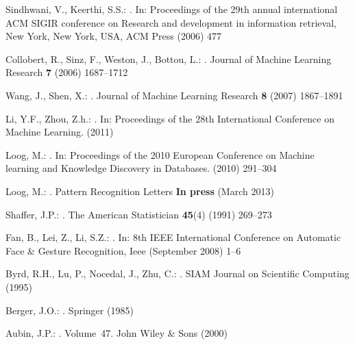 \documentclass[smallcondensed]{svjour3}
\begin{document}
\begin{thebibliography}{10}
Sindhwani, V., Keerthi, S.S.:
.
\newblock In: Proceedings of the 29th annual international ACM SIGIR conference
  on Research and development in information retrieval, New York, New York,
  USA, ACM Press (2006)  477

Collobert, R., Sinz, F., Weston, J., Bottou, L.:
.
\newblock Journal of Machine Learning Research \textbf{7} (2006)  1687--1712

Wang, J., Shen, X.:
.
\newblock Journal of Machine Learning Research \textbf{8} (2007)  1867--1891

Li, Y.F., Zhou, Z.h.:
.
\newblock In: Proceedings of the 28th International Conference on Machine
  Learning. (2011)

Loog, M.:
.
\newblock In: Proceedings of the 2010 European Conference on Machine learning
  and Knowledge Discovery in Databases. (2010)  291--304

Loog, M.:
.
\newblock Pattern Recognition Letters \textbf{In press} (March 2013)

Shaffer, J.P.:
.
\newblock The American Statistician \textbf{45}(4) (1991)  269--273

Fan, B., Lei, Z., Li, S.Z.:
.
\newblock In: 8th IEEE International Conference on Automatic Face \& Gesture
  Recognition, Ieee (September 2008)  1--6

Byrd, R.H., Lu, P., Nocedal, J., Zhu, C.:
.
\newblock SIAM Journal on Scientific Computing (1995)

Berger, J.O.:
.
\newblock Springer (1985)

Aubin, J.P.:
. Volume~47.
\newblock John Wiley \& Sons (2000)


\end{thebibliography}
\end{document}
